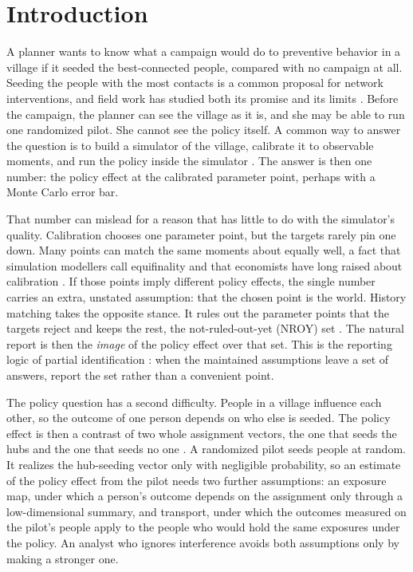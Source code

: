 \section{Introduction}\label{sec:intro}

A planner wants to know what a campaign would do to preventive behavior in a
village if it seeded the \KSeeded{} best-connected people, compared with no
campaign at all. Seeding the people with the most contacts is a common proposal
for network interventions, and field work has studied both its promise and its
limits \citep{banerjee2013,kim2015}. Before the campaign, the planner can see the
village as it is, and she may be able to run one randomized pilot. She cannot see
the policy itself. A common way to answer the question is to build a simulator of
the village, calibrate it to observable moments, and run the policy inside the
simulator \citep{kydland1996}. The answer is then one number: the policy effect
at the calibrated parameter point, perhaps with a Monte Carlo error bar.

That number can mislead for a reason that has little to do with the simulator's
quality. Calibration chooses one parameter point, but the targets rarely pin one
down. Many points can match the same moments about equally well, a fact that
simulation modellers call equifinality \citep{beven2006} and that economists have
long raised about calibration \citep{hansen1996}. If those points imply different
policy effects, the single number carries an extra, unstated assumption: that the
chosen point is the world. History matching takes the opposite stance. It rules
out the parameter points that the targets reject and keeps the rest, the
not-ruled-out-yet (NROY) set \citep{craig1997,vernon2010,andrianakis2015}. The
natural report is then the \emph{image} of the policy effect over that set. This
is the reporting logic of partial identification \citep{manski2003,tamer2010}:
when the maintained assumptions leave a set of answers, report the set rather
than a convenient point.

The policy question has a second difficulty. People in a village influence each
other, so the outcome of one person depends on who else is seeded. The policy
effect is then a contrast of two whole assignment vectors, the one that seeds the
hubs and the one that seeds no one \citep{halloran1995,hudgens2008,manski2013}.
A randomized pilot seeds people at random. It realizes the hub-seeding vector only
with negligible probability, so an estimate of the policy effect from the pilot
needs two further assumptions: an exposure map, under which a person's outcome
depends on the assignment only through a low-dimensional summary, and transport,
under which the outcomes measured on the pilot's people apply to the people who
would hold the same exposures under the policy. An analyst who ignores
interference avoids both assumptions only by making a stronger one.

